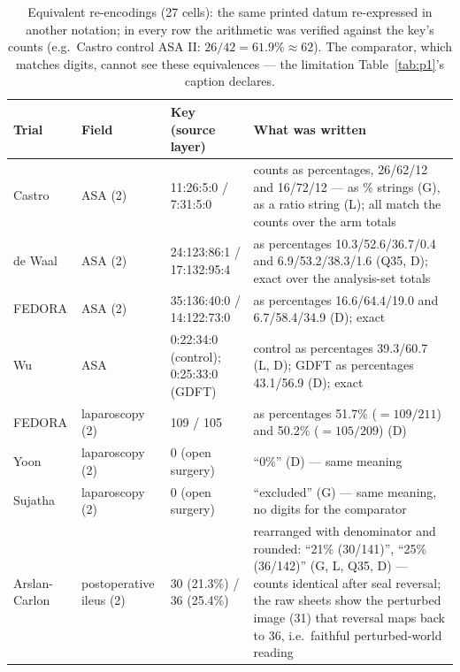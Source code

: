 \documentclass[11pt]{article}
\begin{document}
\begin{table}[H]
\centering\footnotesize
\caption{Equivalent re-encodings (27 cells): the same printed datum re-expressed in another notation; in every row the arithmetic was verified against the key's counts (e.g.\ Castro control ASA II: $26/42 = 61.9\% \approx 62$). The comparator, which matches digits, cannot see these equivalences --- the limitation Table~\ref{tab:p1}'s caption declares.}
\setlength{\tabcolsep}{4pt}
\begin{tabular}{p{2.4cm}p{2.5cm}p{4.0cm}p{5.3cm}}
\toprule
Trial & Field & Key (source layer) & What was written \\
\midrule
Castro & ASA (2) & 11:26:5:0 / 7:31:5:0 & counts as percentages, 26/62/12 and 16/72/12 --- as \% strings (G), as a ratio string (L); all match the counts over the arm totals \\
de Waal & ASA (2) & 24:123:86:1 / 17:132:95:4 & as percentages 10.3/52.6/36.7/0.4 and 6.9/53.2/38.3/1.6 (Q35, D); exact over the analysis-set totals \\
FEDORA & ASA (2) & 35:136:40:0 / 14:122:73:0 & as percentages 16.6/64.4/19.0 and 6.7/58.4/34.9 (D); exact \\
Wu & ASA & 0:22:34:0 (control); 0:25:33:0 (GDFT) & control as percentages 39.3/60.7 (L, D); GDFT as percentages 43.1/56.9 (D); exact \\
FEDORA & laparoscopy (2) & 109 / 105 & as percentages 51.7\% ($=109/211$) and 50.2\% ($=105/209$) (D) \\
Yoon & laparoscopy (2) & 0 (open surgery) & ``0\%'' (D) --- same meaning \\
Sujatha & laparoscopy (2) & 0 (open surgery) & ``excluded'' (G) --- same meaning, no digits for the comparator \\
Arslan-Carlon & postoperative ileus (2) & 30 (21.3\%) / 36 (25.4\%) & rearranged with denominator and rounded: ``21\% (30/141)'', ``25\% (36/142)'' (G, L, Q35, D) --- counts identical after seal reversal; the raw sheets show the perturbed image (31) that reversal maps back to 36, i.e.\ faithful perturbed-world reading \\
\bottomrule
\end{tabular}
\end{table}
\end{document}
